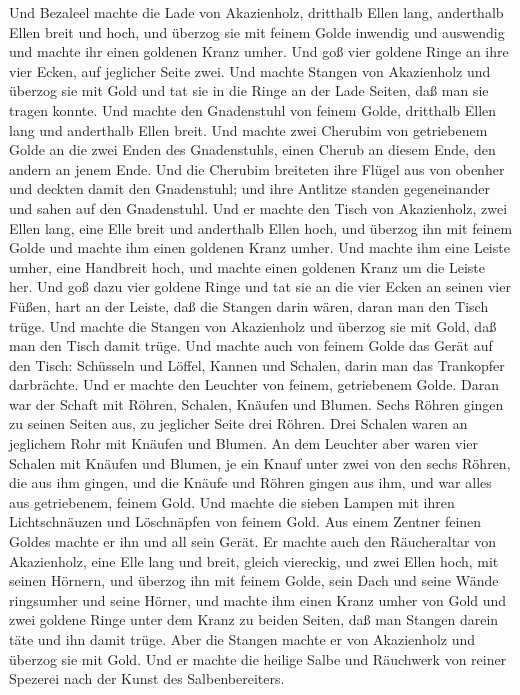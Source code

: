  Und Bezaleel machte die Lade von Akazienholz, dritthalb
Ellen lang, anderthalb Ellen breit und hoch,  und überzog
sie mit feinem Golde inwendig und auswendig und machte ihr einen
goldenen Kranz umher.  Und goß vier goldene Ringe an ihre
vier Ecken, auf jeglicher Seite zwei.  Und machte Stangen
von Akazienholz und überzog sie mit Gold  und tat sie in die
Ringe an der Lade Seiten, daß man sie tragen konnte.  Und
machte den Gnadenstuhl von feinem Golde, dritthalb Ellen lang und
anderthalb Ellen breit.  Und machte zwei Cherubim von
getriebenem Golde an die zwei Enden des Gnadenstuhls,  einen
Cherub an diesem Ende, den andern an jenem Ende.  Und die
Cherubim breiteten ihre Flügel aus von obenher und deckten damit den
Gnadenstuhl; und ihre Antlitze standen gegeneinander und sahen auf den
Gnadenstuhl.  Und er machte den Tisch von Akazienholz, zwei
Ellen lang, eine Elle breit und anderthalb Ellen hoch,  und
überzog ihn mit feinem Golde und machte ihm einen goldenen Kranz umher.
 Und machte ihm eine Leiste umher, eine Handbreit hoch, und
machte einen goldenen Kranz um die Leiste her.  Und goß
dazu vier goldene Ringe und tat sie an die vier Ecken an seinen vier
Füßen,  hart an der Leiste, daß die Stangen darin wären,
daran man den Tisch trüge.  Und machte die Stangen von
Akazienholz und überzog sie mit Gold, daß man den Tisch damit trüge.
 Und machte auch von feinem Golde das Gerät auf den Tisch:
Schüsseln und Löffel, Kannen und Schalen, darin man das Trankopfer
darbrächte.  Und er machte den Leuchter von feinem,
getriebenem Golde. Daran war der Schaft mit Röhren, Schalen, Knäufen und
Blumen.  Sechs Röhren gingen zu seinen Seiten aus, zu
jeglicher Seite drei Röhren.  Drei Schalen waren an
jeglichem Rohr mit Knäufen und Blumen.  An dem Leuchter
aber waren vier Schalen mit Knäufen und Blumen,  je ein
Knauf unter zwei von den sechs Röhren, die aus ihm gingen, 
und die Knäufe und Röhren gingen aus ihm, und war alles aus getriebenem,
feinem Gold.  Und machte die sieben Lampen mit ihren
Lichtschnäuzen und Löschnäpfen von feinem Gold.  Aus einem
Zentner feinen Goldes machte er ihn und all sein Gerät.  Er
machte auch den Räucheraltar von Akazienholz, eine Elle lang und breit,
gleich viereckig, und zwei Ellen hoch, mit seinen Hörnern, 
und überzog ihn mit feinem Golde, sein Dach und seine Wände ringsumher
und seine Hörner, und machte ihm einen Kranz umher von Gold
 und zwei goldene Ringe unter dem Kranz zu beiden Seiten,
daß man Stangen darein täte und ihn damit trüge.  Aber die
Stangen machte er von Akazienholz und überzog sie mit Gold.
 Und er machte die heilige Salbe und Räuchwerk von reiner
Spezerei nach der Kunst des Salbenbereiters.

